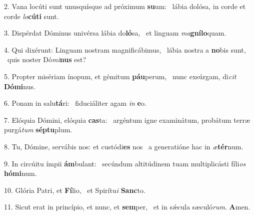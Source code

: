 2. Vana locúti sunt unusquísque ad próximum \textbf{su}um: \ast\  lábia dolósa, in corde et corde \textit{lo}\textbf{cú}\textbf{ti} sunt.\

3. Dispérdat Dóminus univérsa lábia do\textbf{ló}sa, \ast\  et linguam \textit{ma}\textbf{gní}\textbf{lo}quam.\

4. Qui dixérunt: Linguam nostram magnificábimus, \dag\  lábia nostra a \textbf{no}bis sunt, \ast\  quis noster Dó\textit{mi}\textbf{nus} est?\

5. Propter misériam ínopum, et gémitum \textbf{páu}perum, \ast\  nunc exsúrgam, di\textit{cit} \textbf{Dó}\textbf{mi}nus.\

6. Ponam in salu\textbf{tá}ri: \ast\  fiduciáliter agam \textit{in} \textbf{e}o.\

7. Elóquia Dómini, elóquia \textbf{cas}ta: \ast\  argéntum igne examinátum, probátum terræ purgá\textit{tum} \textbf{sép}\textbf{tu}plum.\

8. Tu, Dómine, servábis nos: et custódi\textbf{es} nos \ast\  a generatióne hac in \textit{æ}\textbf{tér}num.\

9. In circúitu ímpii \textbf{ám}bulant: \ast\  secúndum altitúdinem tuam multiplicásti fíli\textit{os} \textbf{hó}\textbf{mi}num.\

10. Glória Patri, et \textbf{Fí}lio, \ast\  et Spirítu\textit{i} \textbf{Sanc}to.\

11. Sicut erat in princípio, et nunc, et \textbf{sem}per, \ast\  et in sǽcula sæculó\textit{rum}. \textbf{A}men.\

